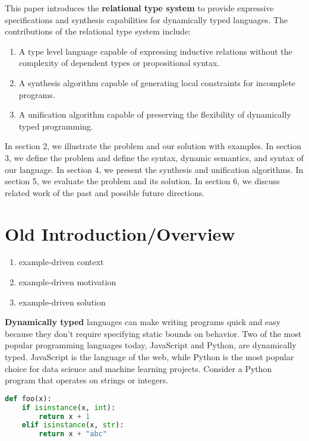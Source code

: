 \documentclass[sigplan,screen]{acmart}
\begin{document}
This paper introduces the \textbf{relational type system} to provide expressive specifications 
and synthesis capabilities for dynamically typed languages. 
The contributions of the relational type system include:
\begin{enumerate}
  \item A type level language capable of expressing inductive relations without the complexity of dependent types or propositional syntax.  
  \item A synthesis algorithm capable of generating local constraints for incomplete programs. 
  \item A unification algorithm capable of preserving the flexibility of dynamically typed programming. 
\end{enumerate}


In section 2, we illustrate the problem and our solution with examples.
In section 3, we define the problem and define the syntax, dynamic semantics, and syntax of our language.
In section 4, we present the synthesis and unification algorithms.
In section 5, we evaluate the problem and its solution. 
In section 6, we discuss related work of the past and possible future directions. 

\section{Old Introduction/Overview}

\begin{enumerate}
  \item example-driven context 
  \item example-driven motivation
  \item example-driven solution  
\end{enumerate}


\textbf{Dynamically typed} languages can make writing programs quick and easy 
because they don't require specifying static bounds on behavior.
Two of the most popular programming languages today, JavaScript and Python, 
are dynamically typed. 
JavaScript is the language of the web, while Python is the most popular choice
for data science and machine learning projects. 
Consider a Python program that operates on strings or integers. 

\begin{lstlisting}[language=Python]
def foo(x):
    if isinstance(x, int):
        return x + 1 
    elif isinstance(x, str): 
        return x + "abc"
\end{lstlisting}
\end{document}

